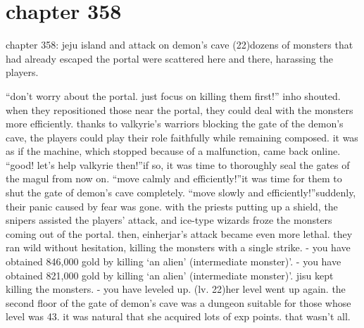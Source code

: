 \section{chapter 358}

chapter 358: jeju island and attack on demon’s cave (22)dozens of monsters that had already escaped the portal were scattered here and there, harassing the players.





“don’t worry about the portal.
 just focus on killing them first!” inho shouted.
when they repositioned those near the portal, they could deal with the monsters more efficiently.
 thanks to valkyrie’s warriors blocking the gate of the demon’s cave, the players could play their role faithfully while remaining composed.
it was as if the machine, which stopped because of a malfunction, came back online.
“good! let’s help valkyrie then!”if so, it was time to thoroughly seal the gates of the magul from now on.
“move calmly and efficiently!”it was time for them to shut the gate of demon’s cave completely.
“move slowly and efficiently!”suddenly, their panic caused by fear was gone.
 with the priests putting up a shield, the snipers assisted the players’ attack, and ice-type wizards froze the monsters coming out of the portal.
then, einherjar’s attack became even more lethal.
 they ran wild without hesitation, killing the monsters with a single strike.
- you have obtained 846,000 gold by killing ‘an alien’ (intermediate monster)’.
- you have obtained 821,000 gold by killing ‘an alien’ (intermediate monster)’.
jisu kept killing the monsters.
- you have leveled up.
 (lv.
 22)her level went up again.
 the second floor of the gate of demon’s cave was a dungeon suitable for those whose level was 43.
 it was natural that she acquired lots of exp points.
that wasn’t all.

